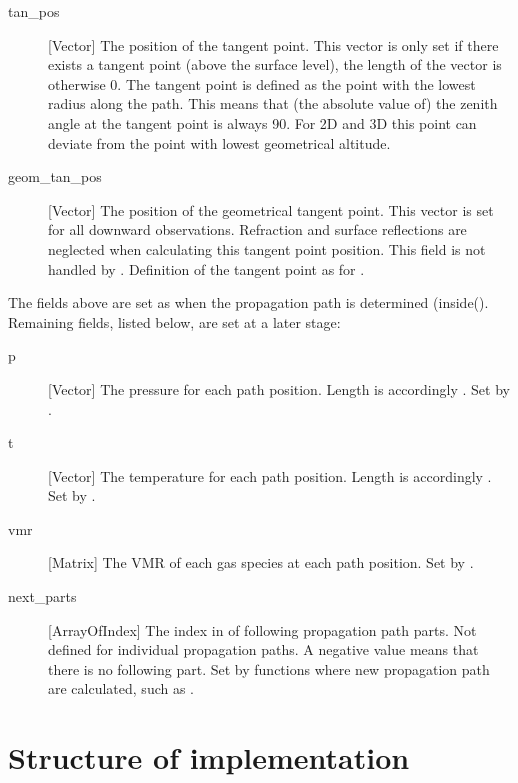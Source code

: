 \begin{description}
   \item[tan\_pos] [Vector] The position of the tangent point. This
     vector is only set if there exists a tangent point (above the
     surface level), the length of the vector is otherwise 0. The
     tangent point is defined as the point with the lowest radius
     along the path. This means that (the absolute value of) the
     zenith angle at the tangent point is always 90\degree. For 2D
     and 3D this point can deviate from the point with lowest
     geometrical altitude.
     
   \item[geom\_tan\_pos] [Vector] The position of the geometrical
     tangent point. This vector is set for all downward observations.
     Refraction and surface reflections are neglected when calculating
     this tangent point position. This field is not handled by
     . Definition of the tangent point
     as for .
\end{description}

The fields above are set as when the propagation path is determined
(inside(). Remaining fields, listed below, are
set at a later stage:

\begin{description}

\item[p] [Vector] The pressure for each path position. Length is
  accordingly . Set by .

\item[t] [Vector] The temperature for each path position. Length is
  accordingly . Set by .
  
\item[vmr] [Matrix] The VMR of each gas species at each path
  position. Set by .
  
\item[next\_parts] [ArrayOfIndex] The index in
   of following propagation path parts. Not
  defined for individual propagation paths. A negative value means
  that there is no following part.
  Set by functions where new propagation path are calculated, such as
  .
\end{description}


\section{Structure of implementation}
\label{sec:ppath:structure}

